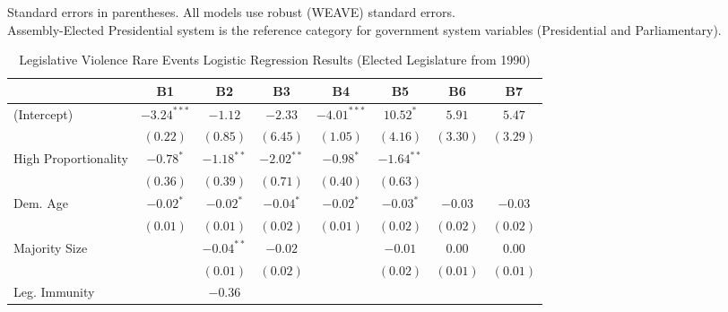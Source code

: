 \documentclass[a4paper]{article}\usepackage{graphicx, color}
\begin{document}
\begin{table}
\begin{center}
\end{center}
{\scriptsize{
    Standard errors in parentheses. All models use robust (WEAVE) standard errors. \\
    Assembly-Elected Presidential system is the reference category for government system variables (Presidential and Parliamentary). \\
}}
\end{table}

\begin{table}
\caption{Legislative Violence Rare Events Logistic Regression Results (Elected Legislature from 1990)}
\label{outputTable.1990}
\begin{center}

\begin{tabular}{l c c c c c c c }
\hline
                         & B1 & B2 & B3 & B4 & B5 & B6 & B7 \\
\hline
(Intercept)              & $-3.24^{***}$ & $-1.12$      & $-2.33$      & $-4.01^{***}$ & $10.52^{*}$   & $5.91$             & $5.47$            \\
                         & $(0.22)$      & $(0.85)$     & $(6.45)$     & $(1.05)$      & $(4.16)$      & $(3.30)$           & $(3.29)$          \\
High Proportionality     & $-0.78^{*}$   & $-1.18^{**}$ & $-2.02^{**}$ & $-0.98^{*}$   & $-1.64^{**}$  &                    &                   \\
                         & $(0.36)$      & $(0.39)$     & $(0.71)$     & $(0.40)$      & $(0.63)$      &                    &                   \\
Dem. Age                 & $-0.02^{*}$   & $-0.02^{*}$  & $-0.04^{*}$  & $-0.02^{*}$   & $-0.03^{*}$   & $-0.03$            & $-0.03$           \\
                         & $(0.01)$      & $(0.01)$     & $(0.02)$     & $(0.01)$      & $(0.02)$      & $(0.02)$           & $(0.02)$          \\
Majority Size            &               & $-0.04^{**}$ & $-0.02$      &               & $-0.01$       & $0.00$             & $0.00$            \\
                         &               & $(0.01)$     & $(0.02)$     &               & $(0.02)$      & $(0.01)$           & $(0.01)$          \\
Leg. Immunity            &               & $-0.36$      &              &               &               &                    &                   \\

\end{tabular}
\end{center}
\end{table}
\end{document}
